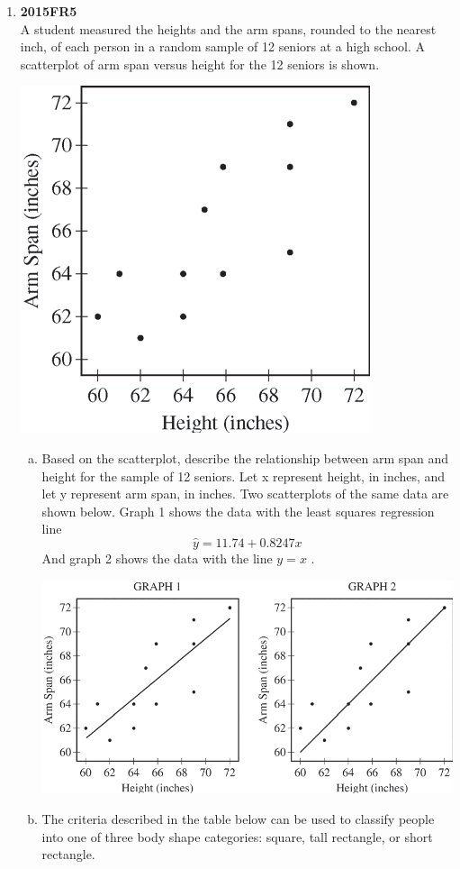\documentclass[a4paper,12pt,twoside]{book}
\begin{document}
\begin{enumerate}
 \item \textbf{2015FR5}\\
  A student measured the heights and the arm spans, rounded to the nearest inch, of each person in a random sample of 12 seniors at a high school. A scatterplot of arm span versus height for the 12 seniors is shown.
  \begin{center}
    \includegraphics[scale=0.5]{2015FR5-1.PNG}
  \end{center}
    \begin{enumerate}[(a), start = 1]
     \item   Based on the scatterplot, describe the relationship between arm span and height for the sample of 12 seniors. Let x represent height, in inches, and let y represent arm span, in inches. Two scatterplots of the same data are shown below. Graph 1 shows the data with the least squares regression line
     $$\hat{y}=11.74+0.8247x$$
     And graph 2 shows the data with the line $y=x$ .
     \begin{center}
    \includegraphics[scale=0.5]{2015FR5-2.PNG}
  \end{center}
   \item  The criteria described in the table below can be used to classify people into one of three body shape categories: square, tall rectangle, or short rectangle.
   

\end{enumerate}
\end{enumerate}
\end{document}
